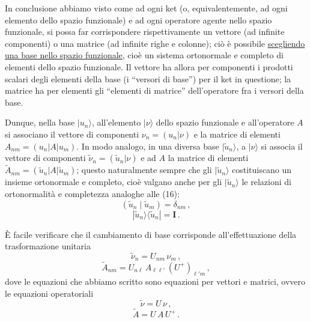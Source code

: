 \documentclass[11pt, a4paper]{book}
\numberwithin{equation}{section}
\begin{document}
In conclusione abbiamo visto come ad ogni ket (o, equivalentemente, ad ogni elemento dello spazio funzionale) e ad ogni operatore agente nello spazio funzionale, si possa far corrispondere rispettivamente un vettore (ad infinite componenti) o una matrice (ad infinite righe e colonne); ciò è possibile \underline{scegliendo una base nello spazio funzionale}, cioè un sistema ortonormale e completo di elementi dello spazio funzionale. Il vettore ha allora per componenti i prodotti scalari degli elementi della base (i ``versori di base'') per il ket in questione; la matrice ha per elementi gli ``elementi di matrice'' dell'operatore fra i versori della base.

Dunque, nella base $|u_n\rangle$, all'elemento $|\nu\rangle$ dello spazio funzionale e all'operatore $A$ si associano il vettore di componenti $\nu_n=(u_n|\nu)$ e la matrice di elementi $A_{nm}=(u_n|A|u_m)$. In modo analogo, in una diversa base $|\tilde{u}_n\rangle$, a $|\nu\rangle$ si associa il vettore di componenti $\tilde{\nu}_n=(\tilde{u}_n|\nu)$ e ad $A$ la matrice di elementi $\tilde{A}_{nm}=(\tilde{u}_n|A|\tilde{u}_m)$; questo naturalmente sempre che gli $|\tilde{u}_n\rangle$ costituiscano un insieme ortonormale e completo, cioè valgano anche per gli $|\tilde{u}_n\rangle$ le relazioni di ortonormalità e completezza analoghe alle (16):
\begin{equation}
(\tilde{u}_n\mid\tilde{u}_m)=\delta_{nm}\,, \tag{18a}
\end{equation}
\begin{equation}
|\tilde{u}_n\rangle\langle\tilde{u}_n|=\mathbf{I}\,. \tag{18b}
\end{equation}

È facile verificare che il cambiamento di base corrisponde all'effettuazione della trasformazione unitaria
\begin{equation}
\tilde{\nu}_n = U_{nm}\,\nu_m\,, \tag{19b}
\end{equation}
\begin{equation}
\tilde{A}_{nm} = U_{n\ell}\,A_{\ell\ell'}\,(U^+)_{\ell' m}\,, \tag{20b}
\end{equation}
dove le equazioni che abbiamo scritto sono equazioni per vettori e matrici, ovvero le equazioni operatoriali
\begin{equation}
\tilde{\nu} = U\,\nu\,, \tag{19a}
\end{equation}
\begin{equation}
\tilde{A} = U\,A\,U^+\,. \tag{20a}
\end{equation}
\end{document}
